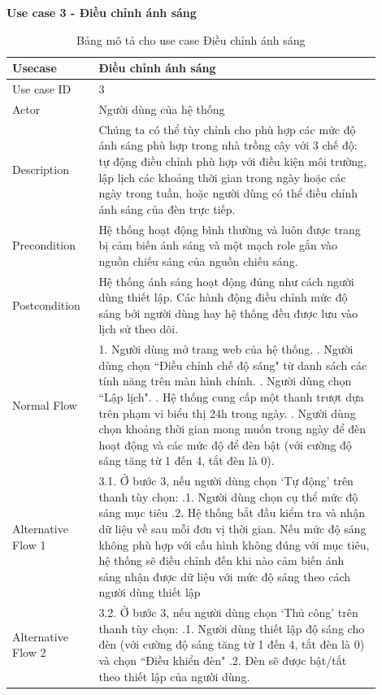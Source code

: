 \textbf{Use case 3 - Điều chỉnh ánh sáng}
\renewcommand{\arraystretch}{1.6}
\begin{table}[H]
\centering
\begin{tabular}{|p{0.2\linewidth}|p{0.7\linewidth}|}
\hline
\rowcolor[HTML]{EFEFEF} 
\textbf{Usecase}        & \textbf{Điều chỉnh ánh sáng} \\ \hline
Use case ID             & 3 \\ \hline
Actor                   & Người dùng của hệ thống \\ \hline
Description             & Chúng ta có thể tùy chỉnh cho phù hợp các mức độ ánh sáng phù hợp trong nhà trồng cây với 3 chế độ: tự động điều chỉnh phù hợp với điều kiện môi trường, lập lịch các khoảng thời gian trong ngày hoặc các ngày trong tuần, hoặc người dùng có thể điều chỉnh ánh sáng của đèn trực tiếp. \\ \hline
Precondition            & Hệ thống hoạt động bình thường và luôn được trang bị cảm biến ánh sáng và một mạch role gắn vào nguồn chiếu sáng của nguồn chiếu sáng. \\ \hline
Postcondition           & Hệ thống ánh sáng hoạt động đúng như cách người dùng thiết lập. Các hành động điều chỉnh mức độ sáng bởi người dùng hay hệ thống đều được lưu vào lịch sử theo dõi. \\ \hline
Normal Flow             & 
    1. Người dùng mở trang web của hệ thống. \newline
    2. Người dùng chọn ``Điều chỉnh chế độ sáng" từ danh sách các tính năng trên màn hình chính. \newline
    3. Người dùng chọn ``Lập lịch". \newline
    4. Hệ thống cung cấp một thanh trượt dựa trên phạm vi biểu thị 24h trong ngày. \newline
    5. Người dùng chọn khoảng thời gian mong muốn trong ngày để đèn hoạt động và các mức độ để đèn bật (với cường độ sáng tăng từ 1 đến 4, tắt đèn là 0). 
\\ \hline
Alternative Flow 1          & 
    3.1. Ở bước 3, nếu người dùng chọn `Tự động' trên thanh tùy chọn: \newline
    3.1.1. Người dùng chọn cụ thể mức độ sáng mục tiêu \newline
    3.1.2. Hệ thống bắt đầu kiểm tra và nhận dữ liệu về sau mỗi đơn vị thời gian. Nếu mức độ sáng không phù hợp với cấu hình không đúng với mục tiêu, hệ thống sẽ điều chỉnh đến khi nào cảm biến ánh sáng nhận được dữ liệu với mức độ sáng theo cách người dùng thiết lập  \\ \hline
Alternative Flow 2          & 
    3.2. Ở bước 3, nếu người dùng chọn `Thủ công' trên thanh tùy chọn: \newline
    3.2.1. Người dùng thiết lập độ sáng cho đèn (với cường độ sáng tăng từ 1 đến 4, tắt đèn là 0) và chọn ``Điều khiển đèn" \newline 
    3.2.2. Đèn sẽ được bật/tắt theo thiết lập của người dùng. \\ \hline
\end{tabular}
\caption{Bảng mô tả cho use case Điều chỉnh ánh sáng}
\end{table}

